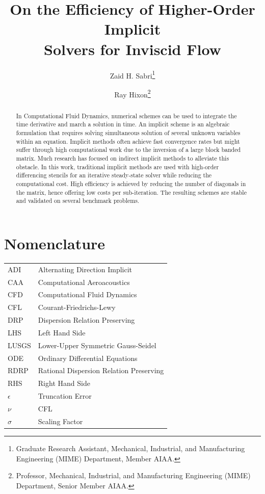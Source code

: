 \documentclass[conf]{new-aiaa}
\title{On the Efficiency of Higher-Order Implicit \\ Solvers for Inviscid Flow
}
\author{Zaid H. Sabri\footnote{Graduate Research Assistant, Mechanical, Industrial, and Manufacturing Engineering (MIME) Department, Member AIAA.}}
\author{Ray Hixon\footnote{Professor, Mechanical, Industrial, and Manufacturing Engineering (MIME) Department, Senior Member AIAA.}}
\affil{University of Toledo, Toledo, OH, 43606}
\begin{document}
\maketitle

\begin{abstract}

In Computational Fluid Dynamics, numerical schemes can be used to integrate the time derivative and march a solution in time. 
An implicit scheme is an algebraic formulation that requires solving simultaneous solution of several unknown variables within an equation. 
Implicit methods often achieve fast convergence rates but might suffer through high computational work due to the inversion of a large block banded matrix.
Much research has focused on indirect implicit methods to alleviate this obstacle.
In this work, traditional implicit methods are used with high-order differencing stencils for an iterative steady-state solver while reducing the computational cost.
High efficiency is achieved by reducing the number of diagonals in the matrix, hence offering low costs per sub-iteration.
The resulting schemes are stable and validated on several benchmark problems.

\end{abstract}

\section{Nomenclature}

{\renewcommand\arraystretch{1.0}
\noindent\begin{longtable*}{@{}l @{\quad=\quad} l@{}}
ADI & Alternating Direction Implicit \\
CAA  & Computational Aeroacoustics \\
CFD & Computational Fluid Dynamics \\
CFL &    Courant-Friedrichs-Lewy \\
DRP & Dispersion Relation Preserving \\
LHS & Left Hand Side \\ 
LUSGS & Lower-Upper Symmetric Gauss-Seidel \\ 
ODE & Ordinary Differential Equations \\
RDRP & Rational Dispersion Relation Preserving \\
RHS & Right Hand Side \\
$\epsilon$ & Truncation Error \\
$\nu$ & CFL \\
$\sigma$ & Scaling Factor

\end{longtable*}}
\end{document}

